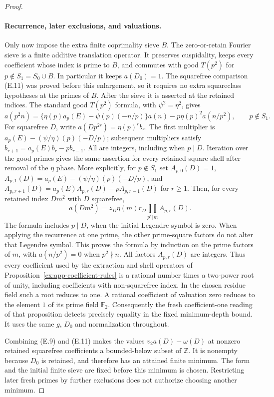 \documentclass[11pt]{article}
\theoremstyle{definition}
\theoremstyle{remark}
\newcommand{\Z}{\mathbb Z}
\newcommand{\F}{\mathbb F}
\begin{document}
\begin{proof}
\paragraph{Recurrence, later exclusions, and valuations.}
Only now impose the extra finite coprimality sieve $B$.
The zero-or-retain Fourier sieve is a finite additive translation
operator. It preserves cuspidality, keeps every coefficient whose
index is prime to $B$, and commutes with good $T(p^2)$ for
$p\notin S_1=S_0\cup B$. In particular it keeps $a(D_0)=1$.
The squarefree comparison (E.11) was proved before this enlargement,
so it requires no extra squareclass hypotheses at the primes of $B$.
After the sieve it is asserted at the retained indices.
The standard good $T(p^2)$ formula, with $\psi^2=\eta^2$, gives
\[
 a(p^2n)=\{\eta(p)a_p(E)-\psi(p)(-n/p)\}a(n)
                       -p\eta(p)^2a(n/p^2),\qquad p\notin S_1.
                                                        \tag{E.12}
\]
For squarefree $D$, write $a(Dp^{2r})=\eta(p)^r b_r$.
The first multiplier is
$a_p(E)-(\psi/\eta)(p)(-D/p)$; subsequent multipliers satisfy
$b_{r+1}=a_p(E)b_r-pb_{r-1}$. All are integers, including when
$p\mid D$. Iteration over the good primes gives the same assertion
for every retained square shell after removal of the $\eta$ phase.
More explicitly, for $p\notin S_1$ set
$A_{p,0}(D)=1$, $A_{p,1}(D)=a_p(E)-(\psi/\eta)(p)(-D/p)$,
and
$A_{p,r+1}(D)=a_p(E)A_{p,r}(D)-pA_{p,r-1}(D)$ for $r\ge1$.
Then, for every retained index $Dm^2$ with $D$ squarefree,
\[
 a(Dm^2)=z_D\eta(m)r_D
              \prod_{p^r\Vert m}A_{p,r}(D).
\]
The formula includes $p\mid D$, when the initial Legendre symbol
is zero. When applying the recurrence at one prime, the other
prime-square factors do not alter that Legendre symbol. This proves
the formula by induction on the prime factors of $m$, with
$a(n/p^2)=0$ when $p^2\nmid n$. All factors $A_{p,r}(D)$ are
integers. Thus every coefficient used by the extraction and shell
operators of Proposition~\ref{ex:app-coefficient-rules} is a rational
number times a two-power root of unity, including coefficients with
non-squarefree index. In the chosen residue field such a root reduces
to one. A rational coefficient of valuation zero reduces to the
element $1$ of its prime field $\F_2$. Consequently the fresh
coefficient-one reading of that proposition detects precisely equality
in the fixed minimum-depth bound. It uses the same $g$, $D_0$ and
normalization throughout.


Combining (E.9) and (E.11) makes the values
$v_2a(D)-\omega(D)$ at nonzero retained squarefree coefficients a
bounded-below subset of $\Z$. It is nonempty because $D_0$ is retained,
and therefore has an attained finite minimum. The form and the initial
finite sieve are fixed before this minimum is chosen. Restricting
later fresh primes by further exclusions does not authorize choosing
another minimum.
\end{proof}
\end{document}
